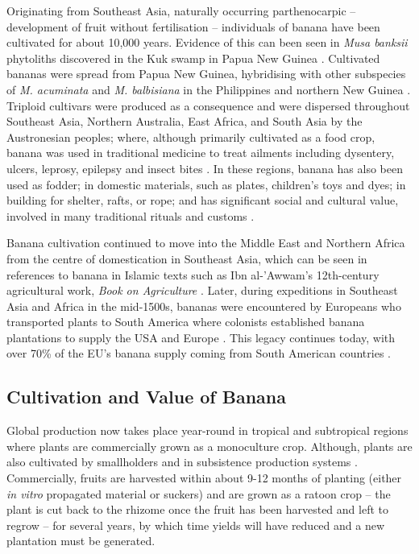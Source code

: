 Originating from Southeast Asia, naturally occurring parthenocarpic – development of fruit without fertilisation – individuals of banana have been cultivated for about 10,000 years. Evidence of this can been seen in \textit{Musa banksii} phytoliths discovered in the Kuk swamp in Papua New Guinea \parencite{Denham2011}.  Cultivated bananas were spread from Papua New Guinea, hybridising with other subspecies of \textit{M. acuminata} and \textit{M. balbisiana} in the Philippines and northern New Guinea \parencite{Perrier2009}. Triploid cultivars were produced as a consequence and were dispersed throughout Southeast Asia, Northern Australia, East Africa, and South Asia by the Austronesian peoples; where, although primarily cultivated as a food crop, banana was used in traditional medicine to treat ailments including dysentery, ulcers, leprosy, epilepsy and insect bites \parencite{Kumar2012}. In these regions, banana has also been used as fodder; in domestic materials, such as plates, children’s toys and dyes; in building for shelter, rafts, or rope; and has significant social and cultural value, involved in many traditional rituals and customs \parencite{Hapsari2017} .  

Banana cultivation continued to move into the Middle East and Northern Africa from the centre of domestication in Southeast Asia, which can be seen in references to banana in Islamic texts such as Ibn al-'Awwam's 12th-century agricultural work, \textit{Book on Agriculture} \parencite{Clement1866}. Later, during expeditions in Southeast Asia and Africa in the mid-1500s, bananas were encountered by Europeans who transported plants to South America where colonists established banana plantations to supply the USA and Europe \parencite{Guzman-Rivas1960, Salas-Pascual2022}. This legacy continues today, with over 70\% of the EU’s banana supply coming from South American countries \parencite{EuropeanUnion2022}.  

\subsection{Cultivation and Value of Banana}

Global production now takes place year-round in tropical and subtropical regions where plants are commercially grown as a monoculture crop. Although, plants are also cultivated by smallholders and in subsistence production systems \parencite{Viljoen2020}. Commercially, fruits are harvested within about 9-12 months of planting (either\textit{ in vitro} propagated material or suckers) and are grown as a ratoon crop – the plant is cut back to the rhizome once the fruit has been harvested and left to regrow – for several years, by which time yields will have reduced and a new plantation must be generated. 

